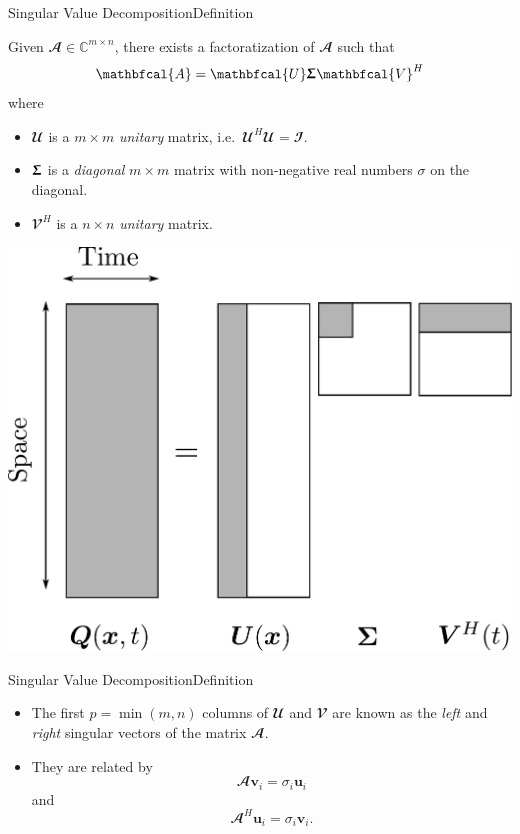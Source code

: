 \documentclass[usenames,dvipsnames,svgnames,10pt,aspectratio=169]{beamer}
\begin{document}
\begin{frame}[t, c]{Singular Value Decomposition}{Definition}
	\begin{minipage}{.48\textwidth}
		Given $\mathbfcal{A} \in \mathbb{C}^{m \times n}$, there exists a factoratization of $\mathbfcal{A}$ such that
		$$\mathbfcal{A} = \mathbfcal{U} \boldsymbol{\Upsigma}\mathbfcal{V}^H$$
		where
		\begin{itemize}
			\item $\mathbfcal{U}$ is a $m \times m$ \emph{unitary} matrix, i.e.\ $\mathbfcal{U}^H \mathbfcal{U} = \mathbfcal{I}$.
			\item $\boldsymbol{\Upsigma}$ is a \emph{diagonal} $m \times m$ matrix with non-negative real numbers $\sigma$ on the diagonal.
			\item $\mathbfcal{V}^H$ is a $n \times n$ \emph{unitary} matrix.
		\end{itemize}
	\end{minipage}%
	\hfill
	\begin{minipage}{.48\textwidth}
		\centering
		\includegraphics[width=.9\textwidth]{svd}
	\end{minipage}

	\vspace{1cm}
\end{frame}

\begin{frame}[t, c]{Singular Value Decomposition}{Definition}
	\begin{itemize}
		\item The first $p = \min(m, n)$ columns of $\mathbfcal{U}$ and $\mathbfcal{V}$ are known as the \emph{left} and \emph{right} singular vectors of the matrix $\mathbfcal{A}$.

		\bigskip

		\item They are related by
		$$\mathbfcal{A} \mathbf{v}_i = \sigma_i \mathbf{u}_i$$
		and
		$$\mathbfcal{A}^H \mathbf{u}_i = \sigma_i \mathbf{v}_i.$$
	\end{itemize}

	\vspace{1cm}
\end{frame}
\end{document}
